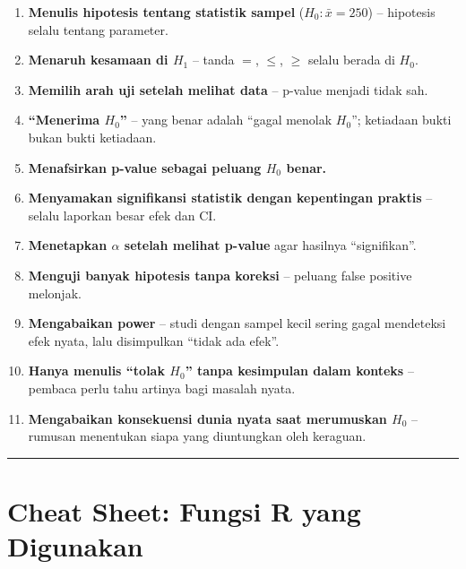 \documentclass[
  indonesian,
  letterpaper,
]{book}
\providecommand{\tightlist}{%
  \setlength{\itemsep}{0pt}\setlength{\parskip}{0pt}}
\begin{document}
\begin{enumerate}
\def\labelenumi{\arabic{enumi}.}
\tightlist
\item
  \textbf{Menulis hipotesis tentang statistik sampel}
  (\(H_0: \bar{x} = 250\)) -- hipotesis selalu tentang parameter.
\item
  \textbf{Menaruh kesamaan di \(H_1\)} -- tanda \(=\), \(\leq\),
  \(\geq\) selalu berada di \(H_0\).
\item
  \textbf{Memilih arah uji setelah melihat data} -- p-value menjadi
  tidak sah.
\item
  \textbf{``Menerima \(H_0\)''} -- yang benar adalah ``gagal menolak
  \(H_0\)''; ketiadaan bukti bukan bukti ketiadaan.
\item
  \textbf{Menafsirkan p-value sebagai peluang \(H_0\) benar.}
\item
  \textbf{Menyamakan signifikansi statistik dengan kepentingan praktis}
  -- selalu laporkan besar efek dan CI.
\item
  \textbf{Menetapkan \(\alpha\) setelah melihat p-value} agar hasilnya
  ``signifikan''.
\item
  \textbf{Menguji banyak hipotesis tanpa koreksi} -- peluang false
  positive melonjak.
\item
  \textbf{Mengabaikan power} -- studi dengan sampel kecil sering gagal
  mendeteksi efek nyata, lalu disimpulkan ``tidak ada efek''.
\item
  \textbf{Hanya menulis ``tolak \(H_0\)'' tanpa kesimpulan dalam
  konteks} -- pembaca perlu tahu artinya bagi masalah nyata.
\item
  \textbf{Mengabaikan konsekuensi dunia nyata saat merumuskan \(H_0\)}
  -- rumusan menentukan siapa yang diuntungkan oleh keraguan.
\end{enumerate}

\begin{center}\rule{0.5\linewidth}{0.5pt}\end{center}


\chapter{Cheat Sheet: Fungsi R yang
Digunakan}\label{cheat-sheet-fungsi-r-yang-digunakan-1}
\end{document}
